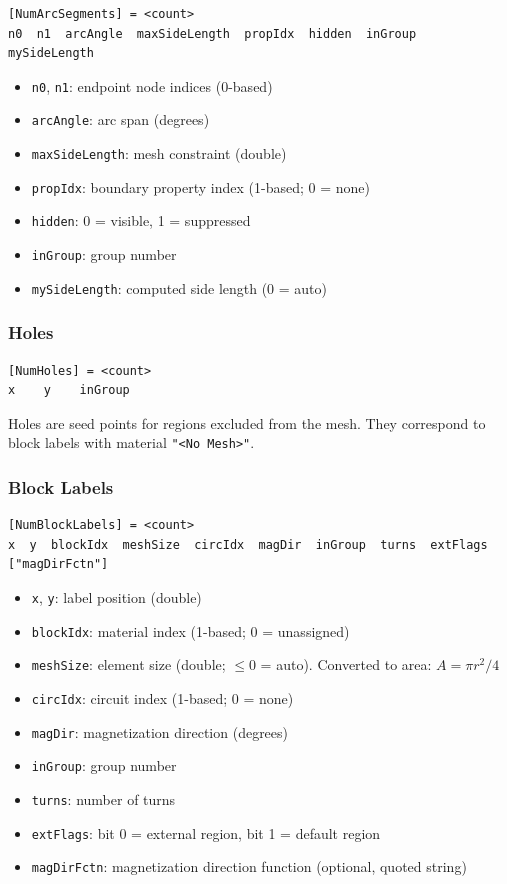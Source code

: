 \documentclass[11pt]{article}
\begin{document}
\begin{lstlisting}
[NumArcSegments] = <count>
n0  n1  arcAngle  maxSideLength  propIdx  hidden  inGroup  mySideLength
\end{lstlisting}

\begin{itemize}[nosep]
  \item \texttt{n0}, \texttt{n1}: endpoint node indices (0-based)
  \item \texttt{arcAngle}: arc span (degrees)
  \item \texttt{maxSideLength}: mesh constraint (double)
  \item \texttt{propIdx}: boundary property index (1-based; 0 = none)
  \item \texttt{hidden}: 0 = visible, 1 = suppressed
  \item \texttt{inGroup}: group number
  \item \texttt{mySideLength}: computed side length (0 = auto)
\end{itemize}

\subsubsection{Holes}

\begin{lstlisting}
[NumHoles] = <count>
x    y    inGroup
\end{lstlisting}

Holes are seed points for regions excluded from the mesh.  They
correspond to block labels with material \texttt{"<No Mesh>"}.

\subsubsection{Block Labels}

\begin{lstlisting}
[NumBlockLabels] = <count>
x  y  blockIdx  meshSize  circIdx  magDir  inGroup  turns  extFlags  ["magDirFctn"]
\end{lstlisting}

\begin{itemize}[nosep]
  \item \texttt{x}, \texttt{y}: label position (double)
  \item \texttt{blockIdx}: material index (1-based; 0 = unassigned)
  \item \texttt{meshSize}: element size (double; $\leq 0$ = auto).
        Converted to area: $A = \pi r^2/4$
  \item \texttt{circIdx}: circuit index (1-based; 0 = none)
  \item \texttt{magDir}: magnetization direction (degrees)
  \item \texttt{inGroup}: group number
  \item \texttt{turns}: number of turns
  \item \texttt{extFlags}: bit 0 = external region, bit 1 = default region
  \item \texttt{magDirFctn}: magnetization direction function (optional, quoted string)
\end{itemize}
\end{document}
